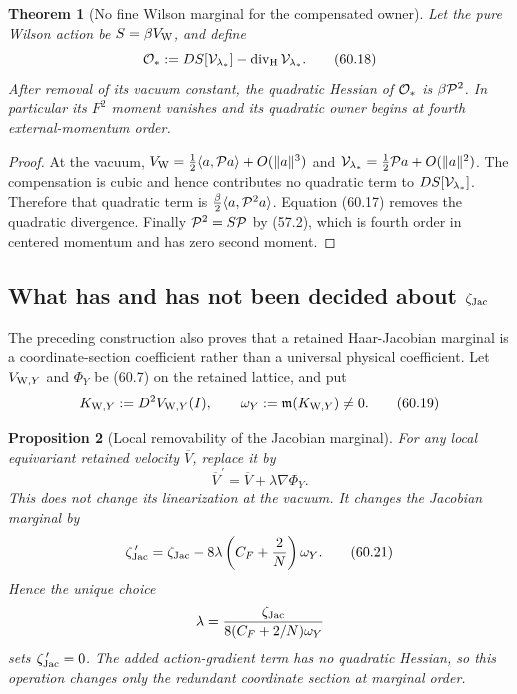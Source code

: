\documentclass[11pt,oneside]{book}
\newtheorem{theorem}{Theorem}[chapter]
\newtheorem{proposition}[theorem]{Proposition}
\theoremstyle{definition}
\theoremstyle{remark}
\begin{document}
\begin{theorem}[No fine Wilson marginal for the compensated owner]
\label{thm:e8v60-no-fine-marginal}
Let the pure Wilson action be \(S=\beta V_{\rm W}\), and define
\[
 {\cal O}_*:=DS[{\cal V}_{\lambda_*}]
             -\operatorname{div}_{\rm H}{\cal V}_{\lambda_*}.
                                                                    \tag{60.18}
\]
After removal of its vacuum constant, the quadratic Hessian of
\({\cal O}_*\) is \(\beta{\cal P}^2\).  In particular its
\(F^2\) moment vanishes and its quadratic owner begins at fourth
external-momentum order.
\end{theorem}

\begin{proof}
At the vacuum,
\(V_{\rm W}=\frac12\langle a,{\cal P}a\rangle+O(\|a\|^3)\)
and
\({\cal V}_{\lambda_*}=\frac12{\cal P}a+O(\|a\|^2)\).
The compensation is cubic and hence contributes no quadratic term
to \(DS[{\cal V}_{\lambda_*}]\).  Therefore that quadratic term is
\(\frac\beta2\langle a,{\cal P}^2a\rangle\).  Equation (60.17)
removes the quadratic divergence.  Finally
\({\cal P}^2=S{\cal P}\) by (57.2), which is fourth order in
centered momentum and has zero second moment.
\end{proof}

\subsection{What has and has not been decided about
\texorpdfstring{\(\zeta_{\rm Jac}\)}{zetaJac}}

The preceding construction also proves that a retained
Haar-Jacobian marginal is a coordinate-section coefficient rather
than a universal physical coefficient.  Let \(V_{{\rm W},Y}\) and
\(\Phi_Y\) be (60.7) on the retained lattice, and put
\[
 K_{{\rm W},Y}:=D^2V_{{\rm W},Y}(I),\qquad
 \omega_Y:={\mathfrak m}(K_{{\rm W},Y})\ne0.                 \tag{60.19}
\]

\begin{proposition}[Local removability of the Jacobian marginal]
\label{prop:e8v60-Jacobian-removable}
For any local equivariant retained velocity \(\overline V\), replace it by
\[
 \overline V^{\,\prime}
 =\overline V+\lambda\nabla\Phi_Y.                           \tag{60.20}
\]
This does not change its linearization at the vacuum.  It changes
the Jacobian marginal by
\[
 \zeta_{\rm Jac}^{\,\prime}
 =\zeta_{\rm Jac}
 -8\lambda\left(C_F+\frac2N\right)\omega_Y.                 \tag{60.21}
\]
Hence the unique choice
\[
 \lambda=\frac{\zeta_{\rm Jac}}
 {8(C_F+2/N)\omega_Y}
\]
sets \(\zeta_{\rm Jac}^{\,\prime}=0\).  The added action-gradient
term has no quadratic Hessian, so this operation changes only the
redundant coordinate section at marginal order.
\end{proposition}
\end{document}
